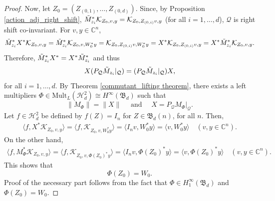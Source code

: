 \documentclass[12pt]{amsart}%
\numberwithin{equation}{section}
\newcommand{\fB}{{\mathfrak{B}}}
\newcommand{\clh}{\mathcal{H}}
\newcommand{\clk}{\mathcal{K}}
\newcommand{\clq}{\mathcal{Q}}
\newcommand{\C}{\mathbb{C}}
\newcommand\la{{\langle }}
\newcommand\ra{{\rangle}}
\begin{document}
\begin{proof}
Now, let $Z_0=(Z_{(0,1)} ,\ldots,Z_{(0,d)})$. Since, by Proposition \ref{action_adj_right_shift}, $\Tilde{M}^*_{z_i} \clk_{Z_0, v, y}=\clk_{Z_0, Z_{(0,i)} v, y}$ (for all $i=1,\ldots,d$), $\clq$ is right shift co-invariant. For $v, y\in \C^n$,
\begin{align*}
\Tilde{M}^*_{z_i}  X^*\clk_{Z_0, v, y}=\Tilde{M}^*_{z_i} \clk_{Z_0, v, W^*_0 y}= \clk_{Z_0, Z_{(0,i)} v, W^*_0 y}=X^*\clk_{Z_0, Z_{(0,i)} v,  y}=X^* \Tilde{M}^*_{z_i}\clk_{Z_0, v, y}.
\end{align*}
Therefore, $\Tilde{M}^*_{z_i}  X^*=X^*\Tilde{M}^*_{z_i}$  and thus
\[X (P_{\clq}\Tilde{M}_{z_i}|_{\clq})=(P_{\clq}\Tilde{M}_{z_i}|_{\clq}) X, \]
for all $i=1,\ldots, d$. By Theorem \ref{commutant_lifting theorem}, there exists a left multipliers $\Phi\in \text{Mult}_L(\clh^2_d)\cong H^{\infty}(\fB_d)$ such that
\[\|M_\Phi\|=\|X\| \quad \text{ and }\quad X=P_{\clq} M_\Phi|_{\clq}.\]
Let $f\in \clh^2_d$ be defined by $f(Z)=I_n$ for $Z\in \fB_d(n)$, for all $n$. Then,
 \begin{align*}
 \la f,X^*\clk_{Z_0, v, y} \ra=\la f, \clk_{Z_0, v, W^*_0 y}  \ra=\la I_n v, W^*_0 y\ra=\la  v, W^*_0 y\ra \quad (v, y\in \C^n).
 \end{align*}
On the other hand,
 \begin{align*}
 \la f,M_\Phi^*\clk_{Z_0, v, y} \ra=\la f, \clk_{Z_0, v, \Phi(Z_0)^* y}  \ra=\la I_n v, \Phi(Z_0)^* y\ra=\la  v, \Phi(Z_0)^* y\ra\quad (v,y \in \C^n).
 \end{align*}
This shows that 
\[\Phi(Z_0)=W_0.\]
Proof of the necessary part follows from the fact that $\Phi\in H_1^\infty(\fB_d)$ and $\Phi(Z_0)=W_0$.
\end{proof}
\end{document}
